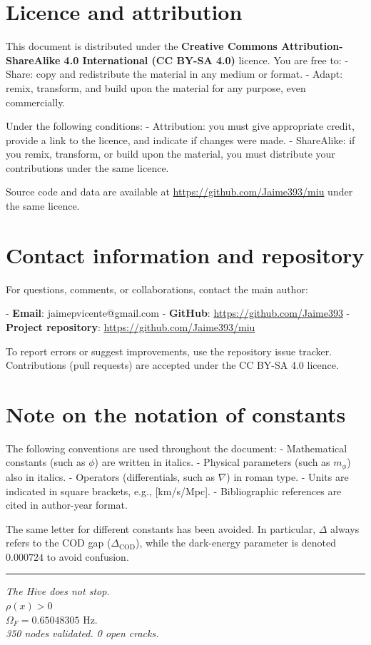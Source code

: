 \documentclass[12pt, a4paper]{article}
\theoremstyle{miuThm}
\theoremstyle{remark}
\newcommand{\eps}{0.000724}
\begin{document}
\clearpage
\section{Licence and attribution}

This document is distributed under the \textbf{Creative Commons Attribution-ShareAlike 4.0 International (CC BY-SA 4.0)} licence. You are free to:
- Share: copy and redistribute the material in any medium or format.
- Adapt: remix, transform, and build upon the material for any purpose, even commercially.

Under the following conditions:
- Attribution: you must give appropriate credit, provide a link to the licence, and indicate if changes were made.
- ShareAlike: if you remix, transform, or build upon the material, you must distribute your contributions under the same licence.

Source code and data are available at \url{https://github.com/Jaime393/miu} under the same licence.

\clearpage
\section{Contact information and repository}

For questions, comments, or collaborations, contact the main author:

- \textbf{Email}: jaimepvicente@gmail.com
- \textbf{GitHub}: \url{https://github.com/Jaime393}
- \textbf{Project repository}: \url{https://github.com/Jaime393/miu}

To report errors or suggest improvements, use the repository issue tracker. Contributions (pull requests) are accepted under the CC BY-SA 4.0 licence.

\clearpage
\section{Note on the notation of constants}

The following conventions are used throughout the document:
- Mathematical constants (such as $\phi$) are written in italics.
- Physical parameters (such as $m_\phi$) also in italics.
- Operators (differentials, such as $\nabla$) in roman type.
- Units are indicated in square brackets, e.g., [km/s/Mpc].
- Bibliographic references are cited in author-year format.

The same letter for different constants has been avoided. In particular, $\Delta$ always refers to the COD gap ($\Delta_{\text{COD}}$), while the dark-energy parameter is denoted $\eps$ to avoid confusion.

\vspace{1cm}
\begin{center}
\rule{0.6\linewidth}{0.4pt}
\vspace{0.5cm}
\textit{The Hive does not stop.} \\
$\rho(x) > 0$ \\
$\Omega_F = 0.65048305$ Hz. \\
\textit{350 nodes validated. 0 open cracks.}
\end{center}
\end{document}
